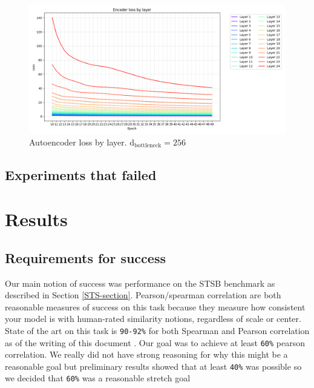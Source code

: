 \documentclass[14pt]{article}
\begin{document}
\begin{figure}
    \centering
    \includegraphics[width=0.85\linewidth]{encoder_loss.png}
    \caption{Autoencoder loss by layer. $\text{d}_\text{bottleneck} = 256$}
    \label{fig:autoencoder-loss}
\end{figure}

\subsection{Experiments that failed}



\section{Results}
\subsection{Requirements for success}
Our main notion of success was performance on the STSB \cite{STS} benchmark as described in Section \ref{STS-section}. Pearson/spearman correlation are both reasonable measures of success on this task because they measure how consistent your model is with human-rated similarity notions, regardless of scale or center. State of the art on this task is \verb|90-92%| for both Spearman and Pearson correlation as of the writing of this document \cite{muennighoff2022mteb}. Our goal was to achieve at least \verb|60%| pearson correlation. We really did not have strong reasoning for why this might be a reasonable goal but preliminary results showed that at least \verb|40%| was possible so we decided that \verb|60%| was a reasonable stretch goal
\end{document}
